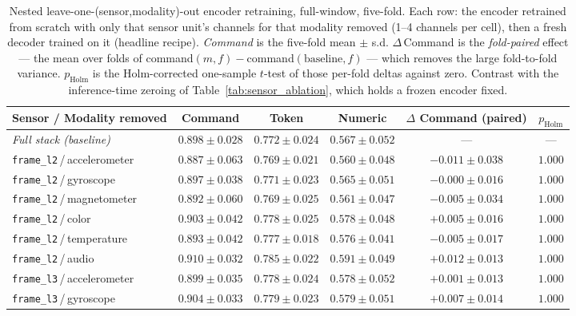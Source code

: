 \begin{table}[!htbp]
\centering
\caption{Nested leave-one-(sensor,modality)-out encoder retraining, full-window, five-fold. Each row: the encoder retrained from scratch with only that sensor unit's channels for that modality removed (1--4 channels per cell), then a fresh decoder trained on it (headline recipe). \emph{Command} is the five-fold mean $\pm$ s.d. $\Delta$\,Command is the \emph{fold-paired} effect --- the mean over folds of command$(m,f)-$command$(\text{baseline},f)$ --- which removes the large fold-to-fold variance. $p_{\text{Holm}}$ is the Holm-corrected one-sample $t$-test of those per-fold deltas against zero. Contrast with the inference-time zeroing of Table~\ref{tab:sensor_ablation}, which holds a frozen encoder fixed.}
\label{tab:lomo_nested}
\footnotesize
\setlength{\tabcolsep}{3pt}
\begin{tabular}{l c c c c c}
\toprule
\textbf{Sensor / Modality removed} & \textbf{Command} & \textbf{Token} & \textbf{Numeric} & \textbf{$\Delta$ Command (paired)} & \textbf{$p_{\text{Holm}}$} \\
\midrule
\textit{Full stack (baseline)} & $0.898 \pm 0.028$ & $0.772 \pm 0.024$ & $0.567 \pm 0.052$ & --- & --- \\
\texttt{frame\_l2}\,/\,accelerometer & $0.887 \pm 0.063$ & $0.769 \pm 0.021$ & $0.560 \pm 0.048$ & $-0.011 \pm 0.038$ & $1.000$ \\
\texttt{frame\_l2}\,/\,gyroscope & $0.897 \pm 0.038$ & $0.771 \pm 0.023$ & $0.565 \pm 0.051$ & $-0.000 \pm 0.016$ & $1.000$ \\
\texttt{frame\_l2}\,/\,magnetometer & $0.892 \pm 0.060$ & $0.769 \pm 0.025$ & $0.561 \pm 0.047$ & $-0.005 \pm 0.034$ & $1.000$ \\
\texttt{frame\_l2}\,/\,color & $0.903 \pm 0.042$ & $0.778 \pm 0.025$ & $0.578 \pm 0.048$ & $+0.005 \pm 0.016$ & $1.000$ \\
\texttt{frame\_l2}\,/\,temperature & $0.893 \pm 0.042$ & $0.777 \pm 0.018$ & $0.576 \pm 0.041$ & $-0.005 \pm 0.017$ & $1.000$ \\
\texttt{frame\_l2}\,/\,audio & $0.910 \pm 0.032$ & $0.785 \pm 0.022$ & $0.591 \pm 0.049$ & $+0.012 \pm 0.013$ & $1.000$ \\
\texttt{frame\_l3}\,/\,accelerometer & $0.899 \pm 0.035$ & $0.778 \pm 0.024$ & $0.578 \pm 0.052$ & $+0.001 \pm 0.013$ & $1.000$ \\
\texttt{frame\_l3}\,/\,gyroscope & $0.904 \pm 0.033$ & $0.779 \pm 0.023$ & $0.579 \pm 0.051$ & $+0.007 \pm 0.014$ & $1.000$ \\

\end{tabular}
\end{table}
